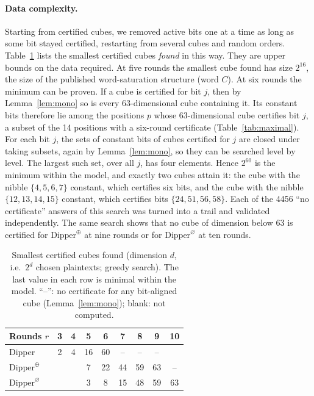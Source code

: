 \documentclass[pdflatex,sn-mathphys-num]{sn-jnl}
\theoremstyle{thmstyleone}
\theoremstyle{thmstylethree}
\theoremstyle{thmstyletwo}
\begin{document}
\paragraph{Data complexity.} Starting from certified cubes, we removed active bits one at a time as long as some bit stayed certified, restarting from several cubes and random orders. Table~\ref{tab:frontier} lists the smallest certified cubes \emph{found} in this way. They are upper bounds on the data required. At five rounds the smallest cube found has size $2^{16}$, the size of the published word-saturation structure (word $C$). At six rounds the minimum can be proven. If a cube is certified for bit $j$, then by Lemma~\ref{lem:mono} so is every 63-dimensional cube containing it. Its constant bits therefore lie among the positions $p$ whose 63-dimensional cube certifies bit $j$, a subset of the 14 positions with a six-round certificate (Table~\ref{tab:maximal}). For each bit $j$, the sets of constant bits of cubes certified for $j$ are closed under taking subsets, again by Lemma~\ref{lem:mono}, so they can be searched level by level. The largest such set, over all $j$, has four elements. Hence $2^{60}$ is the minimum within the model, and exactly two cubes attain it: the cube with the nibble $\{4,5,6,7\}$ constant, which certifies six bits, and the cube with the nibble $\{12,13,14,15\}$ constant, which certifies bits $\{24,51,56,58\}$. Each of the 4456 ``no certificate'' answers of this search was turned into a trail and validated independently. The same search shows that no cube of dimension below 63 is certified for $\mathrm{Dipper}^{\oplus}$ at nine rounds or for $\mathrm{Dipper}^{\varnothing}$ at ten rounds.

\begin{table}[t]\centering
\caption{Smallest certified cubes found (dimension $d$, i.e.\ $2^d$ chosen plaintexts; greedy search). The last value in each row is minimal within the model. ``--'': no certificate for any bit-aligned cube (Lemma~\ref{lem:mono}); blank: not computed.}\label{tab:frontier}
\begin{tabular}{lcccccccc}
\toprule
Rounds $r$ & 3 & 4 & 5 & 6 & 7 & 8 & 9 & 10\\
\midrule
Dipper & 2 & 4 & 16 & 60 & -- & -- & -- & \\
$\mathrm{Dipper}^{\oplus}$ & & & 7 & 22 & 44 & 59 & 63 & --\\
$\mathrm{Dipper}^{\varnothing}$ & & & 3 & 8 & 15 & 48 & 59 & 63\\
\bottomrule
\end{tabular}
\end{table}
\end{document}
